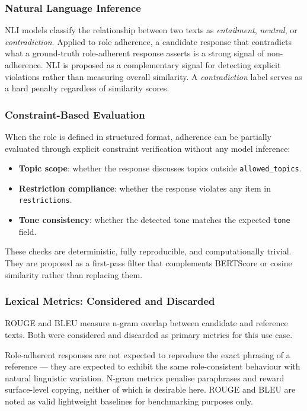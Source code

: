 \documentclass[11pt,a4paper]{article}
\begin{document}
\subsubsection{Natural Language Inference}

NLI models \citep{bowman2015snli} classify the relationship between two texts
as \emph{entailment}, \emph{neutral}, or \emph{contradiction}. Applied to role
adherence, a candidate response that contradicts what a ground-truth
role-adherent response asserts is a strong signal of non-adherence. NLI is
proposed as a complementary signal for detecting explicit violations rather
than measuring overall similarity. A \emph{contradiction} label serves as a
hard penalty regardless of similarity scores.

\subsubsection{Constraint-Based Evaluation}
\label{sec:constraints}

When the role is defined in structured format, adherence can be partially
evaluated through explicit constraint verification without any model inference:

\begin{itemize}
  \item \textbf{Topic scope}: whether the response discusses topics outside
        \texttt{allowed\_topics}.
  \item \textbf{Restriction compliance}: whether the response violates any
        item in \texttt{restrictions}.
  \item \textbf{Tone consistency}: whether the detected tone matches the
        expected \texttt{tone} field.
\end{itemize}

These checks are deterministic, fully reproducible, and computationally
trivial. They are proposed as a first-pass filter that complements
BERTScore or cosine similarity rather than replacing them.

\subsubsection{Lexical Metrics: Considered and Discarded}

ROUGE \citep{lin2004rouge} and BLEU \citep{papineni2002bleu} measure n-gram
overlap between candidate and reference texts. Both were considered and
discarded as primary metrics for this use case.

Role-adherent responses are not expected to reproduce the exact phrasing of a
reference --- they are expected to exhibit the same role-consistent behaviour
with natural linguistic variation. N-gram metrics penalise paraphrases and
reward surface-level copying, neither of which is desirable here. ROUGE and
BLEU are noted as valid lightweight baselines for benchmarking purposes only.
\end{document}
